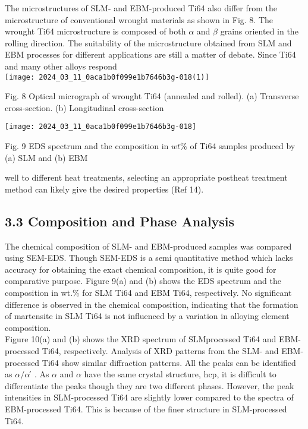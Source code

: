 \documentclass[10pt]{article}
\begin{document}
The microstructures of SLM- and EBM-produced Ti64 also differ from the microstructure of conventional wrought materials as shown in Fig. 8. The wrought Ti64 microstructure is composed of both $\alpha$ and $\beta$ grains oriented in the rolling direction. The suitability of the microstructure obtained from SLM and EBM processes for different applications are still a matter of debate. Since Ti64 and many other alloys respond\\
\texttt{[image: 2024\_03\_11\_0aca1b0f099e1b7646b3g-018(1)]}

Fig. 8 Optical micrograph of wrought Ti64 (annealed and rolled). (a) Transverse cross-section. (b) Longitudinal cross-section

\begin{center}
\texttt{[image: 2024\_03\_11\_0aca1b0f099e1b7646b3g-018]}
\end{center}

Fig. 9 EDS spectrum and the composition in $w t \%$ of Ti64 samples produced by (a) SLM and (b) EBM

well to different heat treatments, selecting an appropriate postheat treatment method can likely give the desired properties (Ref 14).

\subsection*{3.3 Composition and Phase Analysis}
The chemical composition of SLM- and EBM-produced samples was compared using SEM-EDS. Though SEM-EDS is a semi quantitative method which lacks accuracy for obtaining the exact chemical composition, it is quite good for comparative purpose. Figure 9(a) and (b) shows the EDS spectrum and the composition in wt.\% for SLM Ti64 and EBM Ti64, respectively. No significant difference is observed in the chemical composition, indicating that the formation of martensite in SLM Ti64 is not influenced by a variation in alloying element composition.\\
Figure 10(a) and (b) shows the XRD spectrum of SLMprocessed Ti64 and EBM-processed Ti64, respectively. Analysis of XRD patterns from the SLM- and EBM-processed Ti64 show similar diffraction patterns. All the peaks can be identified as $\alpha / \alpha ́$. As $\alpha$ and $\alpha$ have the same crystal structure, hcp, it is difficult to differentiate the peaks though they are two different phases. However, the peak intensities in SLM-processed Ti64 are slightly lower compared to the spectra of EBM-processed Ti64. This is because of the finer structure in SLM-processed Ti64.
\end{document}
